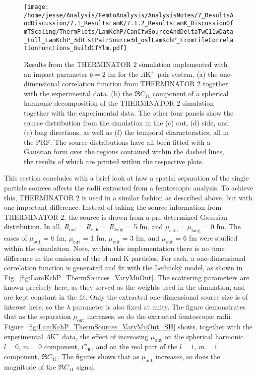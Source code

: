 \documentclass[ALICE,manyauthors]{cernphprep}
\newcommand{\Lam}{$\Lambda$\xspace}
\newcommand{\LamKchP}{$\Lambda\mathrm{K^{+}}$\xspace}
\begin{document}
\begin{figure}[h!]
  \centering
  \texttt{[image: /home/jesse/Analysis/FemtoAnalysis/AnalysisNotes/7\_ResultsAndDiscussion/7.1\_ResultsLamK/7.1.2\_ResultsLamK\_DiscussionOfmTScaling/ThermPlots/LamKchP/CanCfwSourceAndDeltaTwC11wData\_Full\_LamKchP\_3dHistPairSource3d\_oslLamKchP\_FromFileCorrelationFunctions\_BuildCfYlm.pdf]}
  \caption[THERMINATOR 2 simulatin for \LamKchP]
  {
  Results from the THERMINATOR 2 simulation implemented with an impact parameter $b = 2$ fm for the \LamKchP pair system.
  (a) the one-dimensional correlation function from THERMINATOR 2 together with the experimental data.
  (b) the $\Re C_{11}$ component of a spherical harmonic decomposition of the THERMINATOR 2 simulation together with the experimental data.
  The other four panels show the source distribution from the simulation in the (c) out, (d) side, and (e) long directions, as well as (f) the temporal characteristics, all in the PRF.
  The source distributions have all been fitted with a Gaussian form over the regions contained within the dashed lines, the results of which are printed within the respective plots.
  }
  \label{fig:LamKchP_StdThermSources}
\end{figure}



This section concludes with a brief look at how a spatial separation of the single particle sources affects the radii extracted from a femtoscopic analysis.
To achieve this, THERMINATOR 2 is used in a similar fashion as described above, but with one important difference.
Instead of taking the source information from THERMINATOR 2, the source is drawn from a pre-determined Gaussian distribution.
In all, $R_{\mathrm{out}} = R_{\mathrm{side}} = R_{\mathrm{long}}$ = 5 fm, and $\mu_{\mathrm{side}} = \mu_{\mathrm{long}}$ = 0 fm.
The cases of $\mu_{\mathrm{out}}$ = 0 fm, $\mu_{\mathrm{out}}$ = 1 fm, $\mu_{\mathrm{out}}$ = 3 fm, and $\mu_{\mathrm{out}}$ = 6 fm were studied within the simulation.
Note, within this implementation there is no time difference in the emission of the \Lam and K particles.
For each, a one-dimensional correlation function is generated and fit with the Lednick\'y model, as shown in Fig.~\ref{fig:LamKchP_ThermSources_VaryMuOut}.
The scattering parameters are known precisely here, as they served as the weights used in the simulation, and are kept constant in the fit.
Only the extracted one-dimensional source size is of interest here, so the $\lambda$ parameter is also fixed at unity.
The figure demonstrates that as the separation $\mu_{\mathrm{out}}$ increases, so do the extracted femtoscopic radii.
Figure~\ref{fig:LamKchP_ThermSources_VaryMuOut_SH} shows, together with the experimental \LamKchP data, the effect of increasing $\mu_{\mathrm{out}}$ on the spherical harmonic $l=0$, $m=0$ component, $C_{00}$, and on the real part of the $l=1$, $m=1$ component, $\Re C_{11}$.
The figures shows that as $\mu_{\mathrm{out}}$ increases, so does the magnitude of the $\Re C_{11}$ signal.
\end{document}
